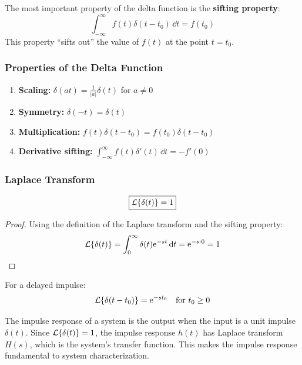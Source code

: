 \begin{keyconceptbox}[title=Sifting Property]
The most important property of the delta function is the \textbf{sifting property}:
\begin{equation}
\int_{-\infty}^{\infty} f(t)\delta(t-t_0) \, \dd t = f(t_0)
\end{equation}
This property ``sifts out'' the value of $f(t)$ at the point $t = t_0$.
\end{keyconceptbox}

\subsubsection{Properties of the Delta Function}

\begin{enumerate}
    \item \textbf{Scaling:} $\delta(at) = \frac{1}{|a|}\delta(t)$ for $a \neq 0$
    \item \textbf{Symmetry:} $\delta(-t) = \delta(t)$
    \item \textbf{Multiplication:} $f(t)\delta(t-t_0) = f(t_0)\delta(t-t_0)$
    \item \textbf{Derivative sifting:} $\int_{-\infty}^{\infty} f(t)\delta'(t) \, \dd t = -f'(0)$
\end{enumerate}

\subsubsection{Laplace Transform}

\begin{equation}
\boxed{\mathcal{L}\{\delta(t)\} = 1}
\end{equation}

\begin{proof}
Using the definition of the Laplace transform and the sifting property:
\begin{equation}
\mathcal{L}\{\delta(t)\} = \int_0^\infty \delta(t)\mathrm{e}^{-st} \, \mathrm{d} t = \mathrm{e}^{-s \cdot 0} = 1
\end{equation}
\end{proof}

For a delayed impulse:
\begin{equation}
\mathcal{L}\{\delta(t-t_0)\} = \mathrm{e}^{-st_0} \quad \text{for } t_0 \geq 0
\end{equation}

\begin{note}
The impulse response of a system is the output when the input is a unit impulse $\delta(t)$. Since $\mathcal{L}\{\delta(t)\} = 1$, the impulse response $h(t)$ has Laplace transform $H(s)$, which is the system's transfer function. This makes the impulse response fundamental to system characterization.
\end{note}

